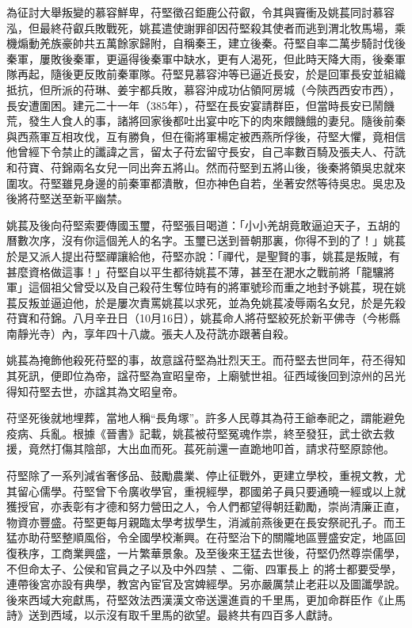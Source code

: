 為征討大舉叛變的慕容鮮卑，苻堅徵召鉅鹿公苻叡，令其與竇衝及姚萇同討慕容泓，但最終苻叡兵敗戰死，姚萇遣使謝罪卻因苻堅殺其使者而逃到渭北牧馬場，乘機煽動羌族豪帥共五萬餘家歸附，自稱秦王，建立後秦。苻堅自率二萬步騎討伐後秦軍，屢敗後秦軍，更逼得後秦軍中缺水，更有人渴死，但此時天降大雨，後秦軍隊再起，隨後更反敗前秦軍隊。苻堅見慕容沖等已逼近長安，於是回軍長安並組織抵抗，但所派的苻琳、姜宇都兵敗，慕容沖成功佔領阿房城（今陝西西安市西），長安遭圍困。建元二十一年（385年），苻堅在長安宴請群臣，但當時長安已鬧饑荒，發生人食人的事，諸將回家後都吐出宴中吃下的肉來餵饑餓的妻兒。隨後前秦與西燕軍互相攻伐，互有勝負，但在衞將軍楊定被西燕所俘後，苻堅大懼，竟相信他曾經下令禁止的讖諱之言，留太子苻宏留守長安，自己率數百騎及張夫人、苻詵和苻寶、苻錦兩名女兒一同出奔五將山。然而苻堅到五將山後，後秦將領吳忠就來圍攻。苻堅雖見身邊的前秦軍都潰散，但亦神色自若，坐著安然等待吳忠。吳忠及後將苻堅送至新平幽禁。

姚萇及後向苻堅索要傳國玉璽，苻堅張目喝道：「小小羌胡竟敢逼迫天子，五胡的曆數次序，沒有你這個羌人的名字。玉璽已送到晉朝那裏，你得不到的了！」姚萇於是又派人提出苻堅禪讓給他，苻堅亦說：「禪代，是聖賢的事，姚萇是叛賊，有甚麼資格做這事！」苻堅自以平生都待姚萇不薄，甚至在淝水之戰前將「龍驤將軍」這個祖父曾受以及自己殺苻生奪位時有的將軍號珍而重之地封予姚萇，現在姚萇反叛並逼迫他，於是屢次責罵姚萇以求死，並為免姚萇凌辱兩名女兒，於是先殺苻寶和苻錦。八月辛丑日（10月16日），姚萇命人將苻堅絞死於新平佛寺（今彬縣南靜光寺）內，享年四十八歲。張夫人及苻詵亦跟著自殺。

姚萇為掩飾他殺死苻堅的事，故意諡苻堅為壯烈天王。而苻堅去世同年，苻丕得知其死訊，便即位為帝，諡苻堅為宣昭皇帝，上廟號世祖。征西域後回到涼州的呂光得知苻堅去世，亦諡其為文昭皇帝。

苻坚死後就地埋葬，當地人稱“長角塚”。許多人民尊其為苻王爺奉祀之，謂能避免疫病、兵亂。根據《晉書》記載，姚萇被苻堅冤魂作祟，終至發狂，武士欲去救援，竟然打傷其陰部，大出血而死。萇死前還一直跪地叩首，請求苻堅原諒他。

苻堅除了一系列減省奢侈品、鼓勵農業、停止征戰外，更建立學校，重視文教，尤其留心儒學。苻堅曾下令廣收學官，重視經學，郡國弟子員只要通曉一經或以上就獲授官，亦表彰有才德和努力營田之人，令人們都望得朝廷勸勵，崇尚清廉正直，物資亦豐盛。苻堅更每月親臨太學考拔學生，消滅前燕後更在長安祭祀孔子。而王猛亦助苻堅整順風俗，令全國學校漸興。在苻堅治下的關隴地區豐盛安定，地區回復秩序，工商業興盛，一片繁華景象。及至後來王猛去世後，苻堅仍然尊崇儒學，不但命太子、公侯和官員之子以及中外四禁 、二衞、四軍長上 的將士都要受學，連帶後宮亦設有典學，教宮內宦官及宮婢經學。另亦嚴厲禁止老莊以及圖讖學說。後來西域大宛獻馬，苻堅效法西漢漢文帝送還進貢的千里馬，更加命群臣作《止馬詩》送到西域，以示沒有取千里馬的欲望。最終共有四百多人獻詩。

